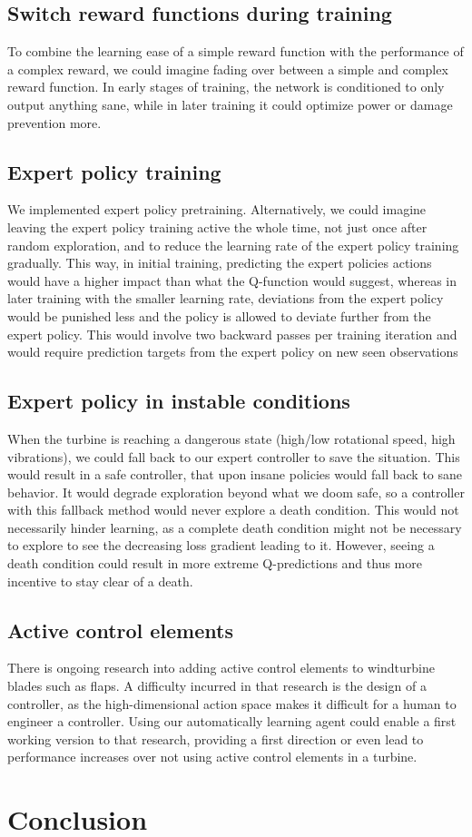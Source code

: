 \documentclass[hyperref,german,beleg]{cgvpub}
\begin{document}
\section{Switch reward functions during training}
To combine the learning ease of a simple reward function with the performance of a complex reward, we could imagine fading over between a simple and complex reward function. In early stages of training, the network is conditioned to only output anything sane, while in later training it could optimize power or damage prevention more.


\section{Expert policy training}

We implemented expert policy pretraining. Alternatively, we could imagine leaving the expert policy training active the whole time, not just once after random exploration, and to reduce the learning rate of the expert policy training gradually. This way, in initial training, predicting the expert policies actions would have a higher impact than what the Q-function would suggest, whereas in later training with the smaller learning rate, deviations from the expert policy would be punished less and the policy is allowed to deviate further from the expert policy. This would involve two backward passes per training iteration and would require prediction targets from the expert policy on new seen observations

\section{Expert policy in instable conditions}
When the turbine is reaching a dangerous state (high/low rotational speed, high vibrations), we could fall back to our expert controller to save the situation. This would result in a safe controller, that upon insane policies would fall back to sane behavior. It would degrade exploration beyond what we doom safe, so a controller with this fallback method would never explore a death condition. This would not necessarily hinder learning, as a complete death condition might not be necessary to explore to see the decreasing loss gradient leading to it. However, seeing a death condition could result in more extreme Q-predictions and thus more incentive to stay clear of a death.

\section{Active control elements}
There is ongoing research into adding active control elements to windturbine blades such as flaps. A difficulty incurred in that research is the design of a controller, as the high-dimensional action space makes it difficult for a human to engineer a controller. Using our automatically learning agent could enable a first working version to that research, providing a first direction or even lead to performance increases over not using active control elements in a turbine.

\chapter{Conclusion}

\end{document}
